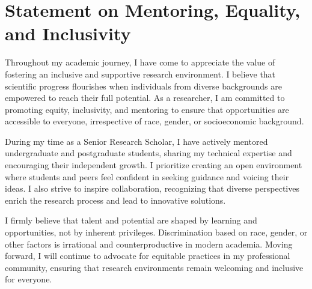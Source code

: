 \documentclass[10pt]{article}
\begin{document}
\section*{Statement on Mentoring, Equality, and Inclusivity}

Throughout my academic journey, I have come to appreciate the value of fostering an inclusive and supportive research environment. I believe that scientific progress flourishes when individuals from diverse backgrounds are empowered to reach their full potential. As a researcher, I am committed to promoting equity, inclusivity, and mentoring to ensure that opportunities are accessible to everyone, irrespective of race, gender, or socioeconomic background.

During my time as a Senior Research Scholar, I have actively mentored undergraduate and postgraduate students, sharing my technical expertise and encouraging their independent growth. I prioritize creating an open environment where students and peers feel confident in seeking guidance and voicing their ideas. I also strive to inspire collaboration, recognizing that diverse perspectives enrich the research process and lead to innovative solutions.

I firmly believe that talent and potential are shaped by learning and opportunities, not by inherent privileges. Discrimination based on race, gender, or other factors is irrational and counterproductive in modern academia. Moving forward, I will continue to advocate for equitable practices in my professional community, ensuring that research environments remain welcoming and inclusive for everyone. 
\end{document}

